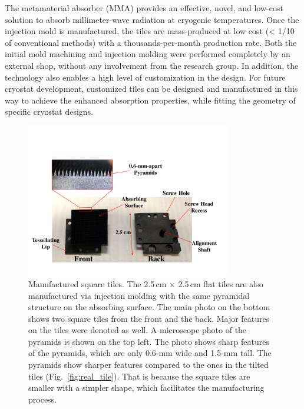 The metamaterial absorber (MMA) provides an effective, novel, and low-cost solution to absorb millimeter-wave radiation at cryogenic temperatures. Once the injection mold is manufactured, the tiles are mass-produced at low cost (< 1/10 of conventional methods) with a thousands-per-month production rate. Both the initial mold machining and injection molding were performed completely by an external shop, without any involvement from the research group. In addition, the technology also enables a high level of customization in the design. For future cryostat development, customized tiles can be designed and manufactured in this way to achieve the enhanced absorption properties, while fitting the geometry of specific cryostat designs.

\begin{figure}[ht]
    \centering
    \includegraphics[width=0.8\textwidth]{Figures/square_tiles.pdf}
    \caption{Manufactured square tiles. The 2.5\,cm $\times$ 2.5\,cm flat tiles are also manufactured via injection molding with the same pyramidal structure on the absorbing surface. The main photo on the bottom shows two square tiles from the front and the back. Major features on the tiles were denoted as well. A microscope photo of the pyramids is shown on the top left. The photo shows sharp features of the pyramids, which are only 0.6-mm wide and 1.5-mm tall. The pyramids show sharper features compared to the ones in the tilted tiles (Fig.~\ref{fig:real_tile}). That is because the square tiles are smaller with a simpler shape, which facilitates the manufacturing process.}
    \label{fig:square_tiles}
\end{figure}

